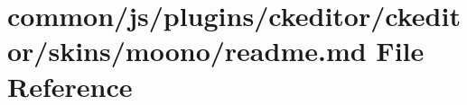 \hypertarget{common_2js_2plugins_2ckeditor_2ckeditor_2skins_2moono_2README_8md}{}\section{common/js/plugins/ckeditor/ckeditor/skins/moono/readme.md File Reference}
\label{common_2js_2plugins_2ckeditor_2ckeditor_2skins_2moono_2README_8md}

